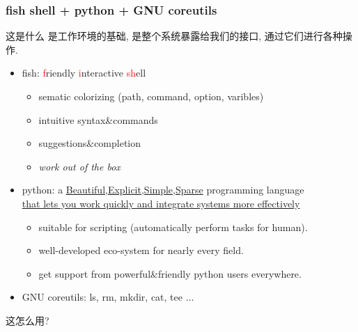 \documentclass[8pt,t]{beamer}
\begin{document}
\begin{frame}
	\frametitle{fish shell + python + GNU coreutils}
	\begin{block}{这是什么}
		是工作环境的基础,
		是整个系统暴露给我们的接口, 通过它们进行各种操作.\\

		\begin{itemize}
			\item fish: \textcolor{red}{f}riendly \textcolor{red}{i}nteractive \textcolor{red}{sh}ell\\
			      \begin{itemize}
				      \item sematic colorizing (path, command, option, varibles)
				      \item intuitive syntax\&commands
				      \item suggestions\&completion
				      \item \emph{work out of the box}
			      \end{itemize}
			\item python: a \href{https://www.python.org/dev/peps/pep-0020/}{Beautiful,Explicit,Simple,Sparse} programming language\\
			      \href{https://www.python.org/}{that lets you work quickly and integrate systems more effectively}
			      \begin{itemize}
				      \item suitable for scripting (automatically perform tasks for human).
				      \item well-developed eco-system for nearly every field.
				      \item get support from powerful\&friendly python users everywhere.
			      \end{itemize}
			\item GNU coreutils: ls, rm, mkdir, cat, tee $\ldots$
		\end{itemize}
	\end{block}

	\begin{examples}
		这怎么用?
	\end{examples}
\end{frame}
\end{document}
